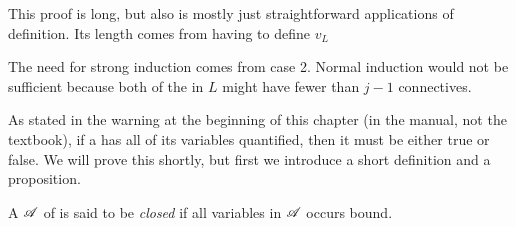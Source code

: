 \begin{proposition}
  \note{} This proof is long, but also is mostly just straightforward applications of definition. Its length comes from having to define \(v_L\) 

  \note{} The need for strong induction comes from case 2. Normal induction would not be sufficient because both of the \wfs{} in \(L\) might have fewer than \(j - 1\) connectives.
\end{proposition}

As stated in the warning at the beginning of this chapter (in the manual, not the textbook), if a \wf{} has all of its variables quantified, then it must be either true or false. We will prove this shortly, but first we introduce a short definition and a proposition.

\begin{definition}
  A \wf{} \(\mathscr{A}\) of \cl{} is said to be \textit{closed} if all variables in \(\mathscr{A}\) occurs bound.
\end{definition}

